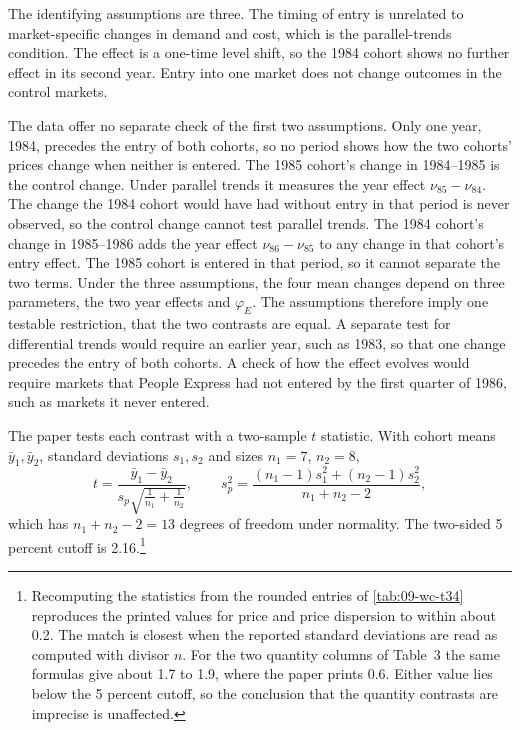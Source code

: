The identifying assumptions are three. The timing of entry is unrelated to market-specific changes in
demand and cost, which is the parallel-trends condition. The effect is a one-time level shift, so the
1984 cohort shows no further effect in its second year. Entry into one market does not change outcomes
in the control markets.

The data offer no separate check of the first two assumptions. Only one year, 1984, precedes the entry
of both cohorts, so no period shows how the two cohorts' prices change when neither is entered. The
1985 cohort's change in 1984--1985 is the control change. Under parallel trends it measures the year
effect $\nu_{85}-\nu_{84}$. The change the 1984 cohort would have had without entry in that period is
never observed, so the control change cannot test parallel trends. The 1984 cohort's change in
1985--1986 adds the year effect $\nu_{86}-\nu_{85}$ to any change in that cohort's entry effect. The
1985 cohort is entered in that period, so it cannot separate the two terms. Under the three assumptions,
the four mean changes depend on three parameters, the two year effects and $\varphi_E$. The assumptions
therefore imply one testable restriction, that the two contrasts are equal. A separate test for differential
trends would require an earlier year, such as 1983, so that one change precedes the entry of both
cohorts. A check of how the effect evolves would require markets that People Express had not entered by
the first quarter of 1986, such as markets it never entered.

The paper tests each contrast with a two-sample $t$ statistic. With cohort means $\bar y_1,\bar y_2$,
standard deviations $s_1,s_2$ and sizes $n_1=7$, $n_2=8$,
\begin{equation*}
t=\frac{\bar y_1-\bar y_2}{s_p\sqrt{\frac{1}{n_1}+\frac{1}{n_2}}},\qquad
s_p^2=\frac{(n_1-1)s_1^2+(n_2-1)s_2^2}{n_1+n_2-2},
\end{equation*}
which has $n_1+n_2-2=13$ degrees of freedom under normality. The two-sided 5 percent cutoff is
2.16.\footnote{Recomputing the statistics from the rounded entries of \cref{tab:09-wc-t34} reproduces
the printed values for price and price dispersion to within about 0.2. The match is closest when the
reported standard deviations are read as computed with divisor $n$. For the two quantity columns of
Table~3 the same formulas give about 1.7 to 1.9, where the paper prints 0.6. Either value lies below
the 5 percent cutoff, so the conclusion that the quantity contrasts are imprecise is unaffected.}%

